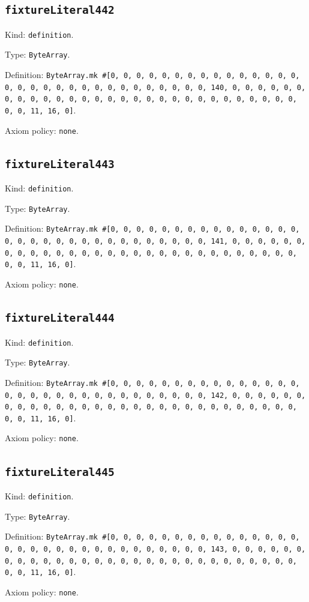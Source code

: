 \documentclass[11pt]{article}
\begin{document}
\subsection*{\texttt{fixtureLiteral442}}
\noindent Kind: \texttt{definition}.\par
\noindent Type: \texttt{ByteArray}.\par
\noindent Definition: \texttt{ByteArray.mk \#[0, 0, 0, 0, 0, 0, 0, 0, 0, 0, 0, 0, 0, 0, 0, 0, 0, 0, 0, 0, 0, 0, 0, 0, 0, 0, 0, 0, 0, 0, 0, 140, 0, 0, 0, 0, 0, 0, 0, 0, 0, 0, 0, 0, 0, 0, 0, 0, 0, 0, 0, 0, 0, 0, 0, 0, 0, 0, 0, 0, 0, 0, 0, 11, 16, 0]}.\par
\noindent Axiom policy: \texttt{none}.\par
\subsection*{\texttt{fixtureLiteral443}}
\noindent Kind: \texttt{definition}.\par
\noindent Type: \texttt{ByteArray}.\par
\noindent Definition: \texttt{ByteArray.mk \#[0, 0, 0, 0, 0, 0, 0, 0, 0, 0, 0, 0, 0, 0, 0, 0, 0, 0, 0, 0, 0, 0, 0, 0, 0, 0, 0, 0, 0, 0, 0, 141, 0, 0, 0, 0, 0, 0, 0, 0, 0, 0, 0, 0, 0, 0, 0, 0, 0, 0, 0, 0, 0, 0, 0, 0, 0, 0, 0, 0, 0, 0, 0, 11, 16, 0]}.\par
\noindent Axiom policy: \texttt{none}.\par
\subsection*{\texttt{fixtureLiteral444}}
\noindent Kind: \texttt{definition}.\par
\noindent Type: \texttt{ByteArray}.\par
\noindent Definition: \texttt{ByteArray.mk \#[0, 0, 0, 0, 0, 0, 0, 0, 0, 0, 0, 0, 0, 0, 0, 0, 0, 0, 0, 0, 0, 0, 0, 0, 0, 0, 0, 0, 0, 0, 0, 142, 0, 0, 0, 0, 0, 0, 0, 0, 0, 0, 0, 0, 0, 0, 0, 0, 0, 0, 0, 0, 0, 0, 0, 0, 0, 0, 0, 0, 0, 0, 0, 11, 16, 0]}.\par
\noindent Axiom policy: \texttt{none}.\par
\subsection*{\texttt{fixtureLiteral445}}
\noindent Kind: \texttt{definition}.\par
\noindent Type: \texttt{ByteArray}.\par
\noindent Definition: \texttt{ByteArray.mk \#[0, 0, 0, 0, 0, 0, 0, 0, 0, 0, 0, 0, 0, 0, 0, 0, 0, 0, 0, 0, 0, 0, 0, 0, 0, 0, 0, 0, 0, 0, 0, 143, 0, 0, 0, 0, 0, 0, 0, 0, 0, 0, 0, 0, 0, 0, 0, 0, 0, 0, 0, 0, 0, 0, 0, 0, 0, 0, 0, 0, 0, 0, 0, 11, 16, 0]}.\par
\noindent Axiom policy: \texttt{none}.\par
\end{document}

